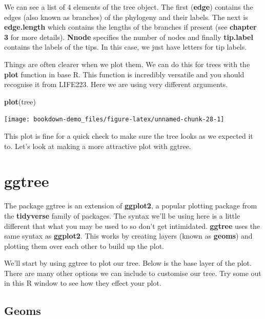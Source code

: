 \documentclass[
]{book}
\newenvironment{Shaded}{\begin{snugshade}}{\end{snugshade}}
\newcommand{\KeywordTok}[1]{\textcolor[rgb]{0.13,0.29,0.53}{\textbf{#1}}}
\newcommand{\NormalTok}[1]{#1}
\begin{document}
We can see a list of 4 elements of the tree object. The first (\textbf{edge}) contains the edges (also known as branches) of the phylogeny and their labels. The next is \textbf{edge.length} which contains the lengths of the branches if present (see \textbf{chapter 3} for more details). \textbf{Nnode} specifies the number of nodes and finally \textbf{tip.label} contains the labels of the tips. In this case, we just have letters for tip labels.

Things are often clearer when we plot them. We can do this for trees with the \textbf{plot} function in base R. This function is incredibly versatile and you should recognise it from LIFE223. Here we are using very different arguments.

\begin{Shaded}
\begin{Highlighting}[]
\KeywordTok{plot}\NormalTok{(tree)}
\end{Highlighting}
\end{Shaded}

\begin{center}\texttt{[image: bookdown-demo\_files/figure-latex/unnamed-chunk-28-1]} \end{center}

This plot is fine for a quick check to make sure the tree looks as we expected it to. Let's look at making a more attractive plot with ggtree.

\hypertarget{ggtree}{%
\section{ggtree}\label{ggtree}}

The package ggtree is an extension of \textbf{ggplot2}, a popular plotting package from the \textbf{tidyverse} family of packages. The syntax we'll be using here is a little different that what you may be used to so don't get intimidated. \textbf{ggtree} uses the same syntax as \textbf{ggplot2}. This works by creating layers (known as \textbf{geoms}) and plotting them over each other to build up the plot.

We'll start by using ggtree to plot our tree. Below is the base layer of the plot. There are many other options we can include to customise our tree. Try some out in this R window to see how they effect your plot.

\hypertarget{geoms}{%
\subsection{Geoms}\label{geoms}}
\end{document}
